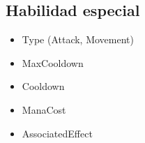\subsection{Habilidad especial}
\begin{itemize}
    \item Type (Attack, Movement)
    \item MaxCooldown
    \item Cooldown
    \item ManaCost
    \item AssociatedEffect
\end{itemize}